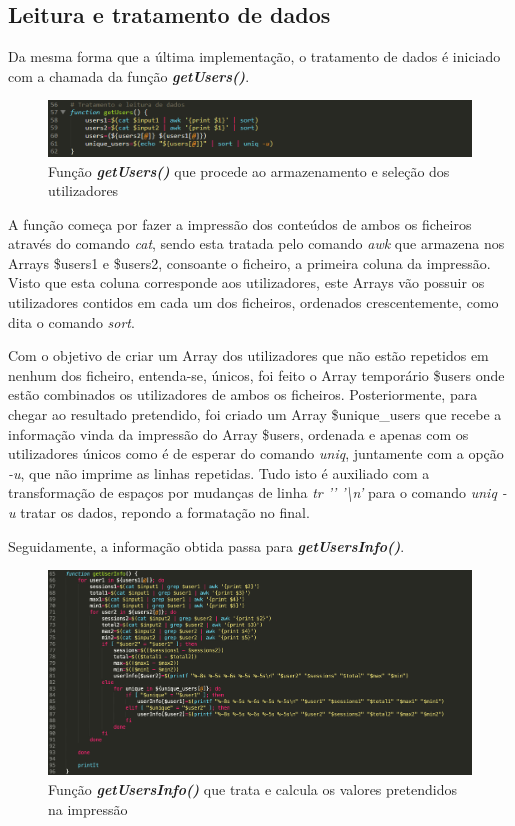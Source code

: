 \documentclass[10pt,portuguese]{article}
\begin{document}
\subsection{Leitura e tratamento de dados}
\newline
\par Da mesma forma que a última implementação, o tratamento de dados é iniciado com a chamada da função \textbf{\textit{getUsers()}}.
\begin{figure}[!h]
    \centering
    \includegraphics[width=\textwidth]{comparestats/getUsers_c.png}
    \caption{Função \textbf{\textit{getUsers()}} que procede ao armazenamento e seleção dos utilizadores}
\end{figure}
\par A função começa por fazer a impressão dos conteúdos de ambos os ficheiros através do comando \textit{cat}, sendo esta tratada pelo comando \textit{awk} que armazena nos Arrays \$users1 e \$users2, consoante o ficheiro, a primeira coluna da impressão. Visto que esta coluna corresponde aos utilizadores, este Arrays vão possuir os utilizadores contidos em cada um dos ficheiros, ordenados crescentemente, como dita o comando \textit{sort}.
\par Com o objetivo de criar um Array dos utilizadores que não estão repetidos em nenhum dos ficheiro, entenda-se, únicos, foi feito o Array temporário \$users onde estão combinados os utilizadores de ambos os ficheiros. Posteriormente, para chegar ao resultado pretendido, foi criado um Array \$unique\_users que recebe a informação vinda da impressão do Array \$users, ordenada e apenas com os utilizadores únicos como é de esperar do comando \textit{uniq}, juntamente com a opção \textit{-u}, que não imprime as linhas repetidas. Tudo isto é auxiliado com a transformação de espaços por mudanças de linha \textit{tr '\hspace{0.2cm}'\hspace{0.2cm} '\textbackslash n'} para o comando \textit{uniq -u} tratar os dados, repondo a formatação no final.
\par Seguidamente, a informação obtida passa para \textbf{\textit{getUsersInfo()}}.
\begin{figure}[!h]
    \centering
    \includegraphics[width=\textwidth]{comparestats/getusersinfo_c.png}
    \caption{Função \textbf{\textit{getUsersInfo()}} que trata e calcula os valores pretendidos na impressão}
\end{figure}
\end{document}
